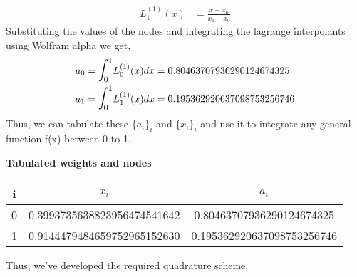 \documentclass[letterpaper]{exam}
\begin{document}
\begin{questions}
\begin{parts}
\begin{solution}
\begin{align*}
    L_1^{(1)}(x) &= \frac{x - x_0}{x_1 - x_0}
\end{align*}
Substituting the values of the nodes and integrating the lagrange interpolants using Wolfram alpha we get,
\begin{align*}
    a_0 &= \mathlarger{\mathlarger{\int}}_0^1 L_0^{(1)}(x) dx = 0.80463707936290124674325\\
    a_1 &= \mathlarger{\mathlarger{\int}}_0^1 L_1^{(1)}(x) dx = 0.195362920637098753256746\\
\end{align*}
Thus, we can tabulate these $\{a_i\}_i$ and $\{x_i\}_i$ and use it to integrate any general function f(x) between 0 to 1.\\
\begin{center}
\textbf{Tabulated weights and nodes}\\
\begin{tabular}{|c|c|c|}
\hline
     i& $x_i$&$a_i$  \\
\hline
     0& 0.3993735638823956474541642& 0.80463707936290124674325\\
\hline
     1& 0.9144479484659752965152630&0.195362920637098753256746\\
\hline
\end{tabular}
\end{center}
Thus, we've developed the required quadrature scheme.
\end{solution}

\end{parts}
\end{questions}
\end{document}
